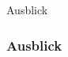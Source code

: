 \documentclass[ngerman]{beamer}
\begin{document}
\begin{section}{Ausblick}

\begin{frame}
    \frametitle{Ausblick}
\end{frame}

\end{section}
\end{document}
